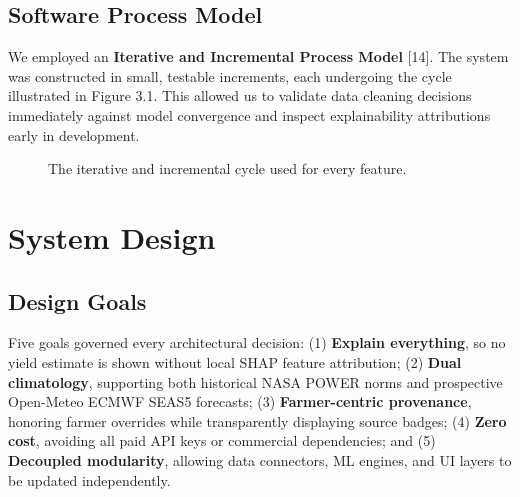\documentclass[11pt,a4paper]{report}
\begin{document}
\section{Software Process Model}
We employed an \textbf{Iterative and Incremental Process Model} [14]. The system was constructed in small, testable increments, each undergoing the cycle illustrated in Figure 3.1. This allowed us to validate data cleaning decisions immediately against model convergence and inspect explainability attributions early in development.

\begin{figure}[htbp]
\centering
{}
\caption{The iterative and incremental cycle used for every feature.}
\end{figure}

\chapter{System Design}

\section{Design Goals}
Five goals governed every architectural decision: (1) \textbf{Explain everything}, so no yield estimate is shown without local SHAP feature attribution; (2) \textbf{Dual climatology}, supporting both historical NASA POWER norms and prospective Open-Meteo ECMWF SEAS5 forecasts; (3) \textbf{Farmer-centric provenance}, honoring farmer overrides while transparently displaying source badges; (4) \textbf{Zero cost}, avoiding all paid API keys or commercial dependencies; and (5) \textbf{Decoupled modularity}, allowing data connectors, ML engines, and UI layers to be updated independently.
\end{document}
